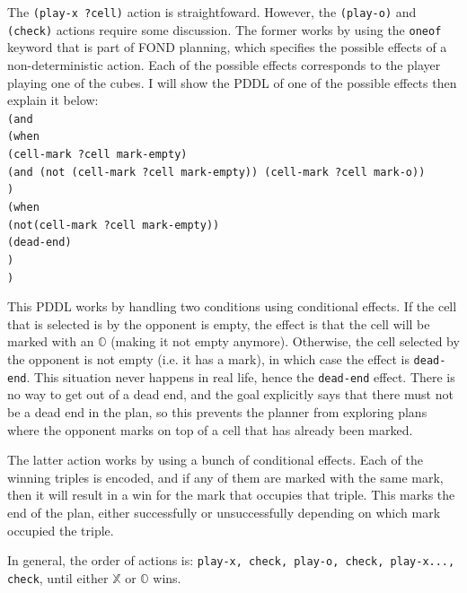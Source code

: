 \documentclass[11pt]{article}
\newcommand{\XX}{$\mathbb{X}$ }
\newcommand{\OO}{$\mathbb{O}$ }
\begin{document}
\noindent The \texttt{(play-x ?cell)} action is straightfoward. However, the \texttt{(play-o)} and \texttt{(check)} actions require some discussion. The former works by using the \texttt{oneof} keyword that is part of FOND planning, which specifies the possible effects of a non-deterministic action. Each of the possible effects corresponds to the player playing one of the cubes. I will show the PDDL of one of the possible effects then explain it below:\\
\texttt{(and \\
    \indent (when \\
    \indent \indent (cell-mark ?cell mark-empty) \\
    \indent \indent (and (not (cell-mark ?cell mark-empty)) (cell-mark ?cell mark-o))\\
    \indent )\\
    \indent (when \\
    \indent \indent (not(cell-mark ?cell mark-empty)) \\
    \indent \indent (dead-end) \\
    \indent)\\
)}

This PDDL works by handling two conditions using conditional effects. If the cell that is selected is by the opponent is empty, the effect is that the cell will be marked with an \OO (making it not empty anymore). Otherwise, the cell selected by the opponent is not empty (i.e. it has a mark), in which case the effect is \texttt{dead-end}. This situation never happens in real life, hence the \texttt{dead-end} effect. There is no way to get out of a dead end, and the goal explicitly says that there must not be a dead end in the plan, so this prevents the planner from exploring plans where the opponent marks on top of a cell that has already been marked.

The latter action works by using a bunch of conditional effects. Each of the winning triples is encoded, and if any of them are marked with the same mark, then it will result in a win for the mark that occupies that triple. This marks the end of the plan, either successfully or unsuccessfully depending on which mark occupied the triple.

In general, the order of actions is: \texttt{play-x, check, play-o, check, play-x..., check}, until either \XX or \OO wins.
\end{document}
